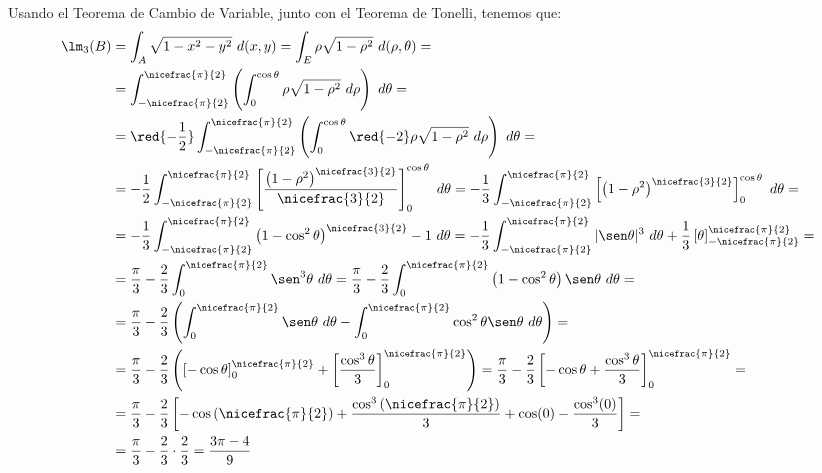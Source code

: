 \begin{ejercicio}
    Usando el Teorema de Cambio de Variable, junto con el Teorema de Tonelli, tenemos que:
    \begin{align*}
        \lm_3(B) &= \int_A \sqrt{1 - x^2 - y^2}~d(x, y) = \int_E \rho\sqrt{1 - \rho^2}~d(\rho, \theta) =\\
        &= \int_{-\nicefrac{\pi}{2}}^{\nicefrac{\pi}{2}} \left( \int_0^{\cos\theta} \rho\sqrt{1 - \rho^2}~d\rho \right)~d\theta =\\
        &= \red{-\frac{1}{2}}\int_{-\nicefrac{\pi}{2}}^{\nicefrac{\pi}{2}} \left( \int_0^{\cos\theta} \red{-2}\rho\sqrt{1 - \rho^2}~d\rho \right)~d\theta =\\
        &= {-\frac{1}{2}}\int_{-\nicefrac{\pi}{2}}^{\nicefrac{\pi}{2}} \left[ \dfrac{\left(1-\rho^2\right)^{\nicefrac{3}{2}}}{\nicefrac{3}{2}} \right]_0^{\cos\theta}~d\theta
        = {-\frac{1}{3}}\int_{-\nicefrac{\pi}{2}}^{\nicefrac{\pi}{2}} \left[ \left(1-\rho^2\right)^{\nicefrac{3}{2}} \right]_0^{\cos\theta}~d\theta =\\
        &= {-\frac{1}{3}}\int_{-\nicefrac{\pi}{2}}^{\nicefrac{\pi}{2}} \left(1-\cos^2\theta\right)^{\nicefrac{3}{2}} - 1~d\theta 
        = {-\frac{1}{3}}\int_{-\nicefrac{\pi}{2}}^{\nicefrac{\pi}{2}} |\sen\theta|^3~d\theta +\frac{1}{3} \left[\theta\right]_{-\nicefrac{\pi}{2}}^{\nicefrac{\pi}{2}} =\\
        &= \frac{\pi}{3} -\frac{2}{3}\int_{0}^{\nicefrac{\pi}{2}} \sen^3\theta~d\theta
        = \frac{\pi}{3} -\frac{2}{3}\int_{0}^{\nicefrac{\pi}{2}} \left(1-\cos^2\theta\right)\sen\theta~d\theta =\\
        &= \frac{\pi}{3} -\frac{2}{3}\left(\int_{0}^{\nicefrac{\pi}{2}} \sen\theta~d\theta - \int_{0}^{\nicefrac{\pi}{2}} \cos^2\theta\sen\theta~d\theta\right) =\\
        &= \frac{\pi}{3} -\frac{2}{3}\left(\left[-\cos\theta\right]_{0}^{\nicefrac{\pi}{2}} + \left[\dfrac{\cos^3\theta}{3}\right]_{0}^{\nicefrac{\pi}{2}}\right)
        = \frac{\pi}{3} -\frac{2}{3}\left[-\cos\theta + \dfrac{\cos^3\theta}{3}\right]_{0}^{\nicefrac{\pi}{2}} =\\
        &= \frac{\pi}{3} -\frac{2}{3}\left[-\cos\left(\nicefrac{\pi}{2}\right) + \dfrac{\cos^3\left(\nicefrac{\pi}{2}\right)}{3} + \cos(0) - \dfrac{\cos^3(0)}{3}\right] =\\
        &= \frac{\pi}{3} -\frac{2}{3}\cdot \frac{2}{3} = \dfrac{3\pi - 4}{9}
    \end{align*}
\end{ejercicio}
    
